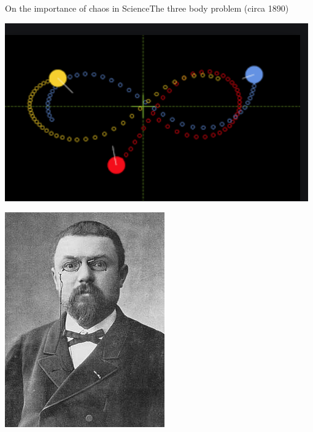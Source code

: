 \documentclass[usenames, dvipsnames, aspectratio=169]{beamer}
\begin{document}
\begin{frame}[t, c]{On the importance of chaos in Science}{The three body problem (circa 1890)}
  \vfill
  \large

  \begin{minipage}{.68\textwidth}
    \centering
    \includegraphics[width=\textwidth]{3body}
  \end{minipage}%
  \hfill
  \begin{minipage}{.28\textwidth}
    \centering
    \includegraphics[width=\textwidth]{poincare}
  \end{minipage}

  \vfill
\end{frame}
\end{document}

